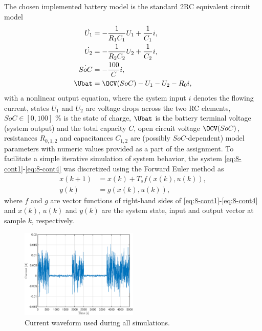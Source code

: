 The chosen implemented battery model is the standard 2RC equivalent circuit model
\begin{align}
        \dot{U_1} &= -\frac{1}{R_1 C_1} U_1 + \frac{1}{C_1} i, \label{eq:8-cont1} \\
        \dot{U_2} &= -\frac{1}{R_2 C_2} U_2 + \frac{1}{C_2} i, \\
        \dot{SoC} &= -\frac{100}{C} i, \\
        \Ubat &= \OCV(SoC) - U_1 - U_2 - R_0i,
    \label{eq:8-cont4}
\end{align}
with a nonlinear output equation, where the system input $i$ denotes the flowing current, states $U_1$ and $U_2$ are voltage drops across the two RC elements, $SoC \in \left[0, 100\right]$ \% is the state of charge, $\Ubat$ is the battery terminal voltage (system output) and the total capacity $C$, open circuit voltage $\OCV(SoC)$, resistances $R_{0,1,2}$ and capacitances $C_{1,2}$ are (possibly $SoC$-dependent) model parameters with numeric values provided as a part of the assignment. To facilitate a simple iterative simulation of system behavior, the system \eqref{eq:8-cont1}-\eqref{eq:8-cont4} was discretized using the Forward Euler method as
\begin{equation}
\begin{split}
    x(k+1) &= x(k) + T_s f(x(k), u(k)), \\
    y(k) &= g(x(k), u(k)),
\end{split}
\label{eq:8-disc}
\end{equation}
where $f$ and $g$ are vector functions of right-hand sides of \eqref{eq:8-cont1}-\eqref{eq:8-cont4} and $x(k)$, $u(k)$ and $y(k)$ are the system state, input and output vector at sample $k$, respectively.

\begin{figure}[H]
    \centering
    \includegraphics[width=0.5\textwidth]{figures/8/validation-I.eps}
    \caption{Current waveform used during all simulations.}
    \label{fig:8-validation-I}
\end{figure}

